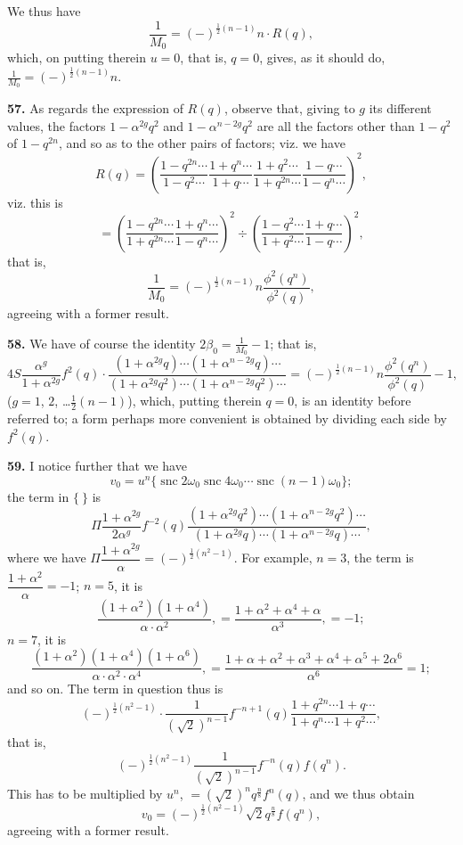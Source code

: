 \documentclass[12pt,a4paper]{article}
\DeclareMathOperator{\snc}{snc}
\begin{document}
We thus have
\[
\frac{1}{M_0} = (-)^{\frac{1}{2}(n-1)} n \cdot R(q),
\]
which, on putting therein $u = 0$, that is, $q = 0$, gives, as it should do, $\frac{1}{M_0} = (-)^{\frac{1}{2}(n-1)} n$.

\textbf{57.} As regards the expression of $R(q)$, observe that, giving to $g$ its different values, the factors $1 - \alpha^{2g}q^2$ and $1 - \alpha^{n-2g}q^2$ are all the factors other than $1 - q^2$ of $1 - q^{2n}$, and so as to the other pairs of factors; viz. we have
\[
R(q) = \left(
\frac{1 - q^{2n} \cdots}{1 - q^2 \cdots}
\frac{1 + q^n \cdots}{1 + q \cdots}
\frac{1 + q^2 \cdots}{1 + q^{2n} \cdots}
\frac{1 - q \cdots}{1 - q^n \cdots}
\right)^2,
\]
viz. this is
\[
= \left(
\frac{1 - q^{2n} \cdots}{1 + q^{2n} \cdots}
\frac{1 + q^n \cdots}{1 - q^n \cdots}
\right)^2 \div
\left(
\frac{1 - q^2 \cdots}{1 + q^2 \cdots}
\frac{1 + q \cdots}{1 - q \cdots}
\right)^2,
\]
that is,
\[
\frac{1}{M_0} = (-)^{\frac{1}{2}(n-1)} n \frac{\phi^2(q^n)}{\phi^2(q)},
\]
agreeing with a former result.

\textbf{58.} We have of course the identity $2\beta_0 = \frac{1}{M_0} - 1$; that is,
\[
4S\frac{\alpha^g}{1 + \alpha^{2g}} f^2(q) \cdot
\frac{(1 + \alpha^{2g}q) \cdots (1 + \alpha^{n-2g}q) \cdots}
{(1 + \alpha^{2g}q^2) \cdots (1 + \alpha^{n-2g}q^2) \cdots}
= (-)^{\frac{1}{2}(n-1)} n \frac{\phi^2(q^n)}{\phi^2(q)} - 1,
\]
($g = 1$, $2$, \ldots $\frac{1}{2}(n-1)$), which, putting therein $q = 0$, is an identity before referred to; a form perhaps more convenient is obtained by dividing each side by $f^2(q)$.

\textbf{59.} I notice further that we have
\[
v_0 = u^n\{\snc 2\omega_0 \snc 4\omega_0 \cdots \snc (n-1)\omega_0\};
\]
the term in $\{~\}$ is
\[
\Pi \frac{1 + \alpha^{2g}}{2\alpha^g} f^{-2}(q)
\frac{(1 + \alpha^{2g}q^2) \cdots (1 + \alpha^{n-2g}q^2) \cdots}
{(1 + \alpha^{2g}q) \cdots (1 + \alpha^{n-2g}q) \cdots},
\]
where we have $\Pi\dfrac{1 + \alpha^{2g}}{\alpha} = (-)^{\frac{1}{2}(n^2 - 1)}$. For example, $n = 3$, the term is $\dfrac{1 + \alpha^2}{\alpha} = -1$; $n = 5$, it is
\[
\frac{(1 + \alpha^2)(1 + \alpha^4)}{\alpha \cdot \alpha^2},
= \frac{1 + \alpha^2 + \alpha^4 + \alpha}{\alpha^3}, = -1;
\]
$n = 7$, it is
\[
\frac{(1 + \alpha^2)(1 + \alpha^4)(1 + \alpha^6)}{\alpha \cdot \alpha^2 \cdot \alpha^4},
= \frac{1 + \alpha + \alpha^2 + \alpha^3 + \alpha^4 + \alpha^5 + 2\alpha^6}{\alpha^6} = 1;
\]
and so on. The term in question thus is
\[
(-)^{\frac{1}{2}(n^2 - 1)} \cdot \frac{1}{(\sqrt{2})^{n-1}} f^{-n+1}(q)
\frac{1 + q^{2n} \cdots 1 + q \cdots}{1 + q^n \cdots 1 + q^2 \cdots},
\]
that is,
\[
(-)^{\frac{1}{2}(n^2 - 1)} \frac{1}{(\sqrt{2})^{n-1}} f^{-n}(q) f(q^n).
\]
This has to be multiplied by $u^n$, $= (\sqrt{2})^n q^{\frac{n}{8}} f^n(q)$, and we thus obtain
\[
v_0 = (-)^{\frac{1}{2}(n^2 - 1)} \sqrt{2} q^{\frac{n}{8}} f(q^n),
\]
agreeing with a former result.
\end{document}
